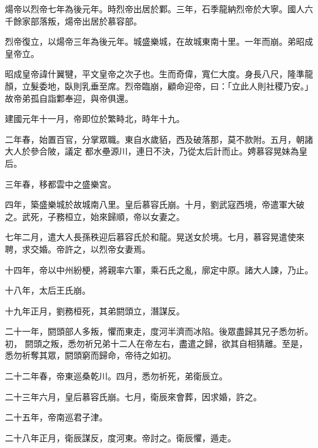 \begin{pinyinscope}
 煬帝以烈帝七年為後元年。時烈帝出居於鄴。三年，石季龍納烈帝於大寧。國人六千餘家部落叛，煬帝出居於慕容部。



 烈帝復立，以煬帝三年為後元年。城盛樂城，在故城東南十里。一年而崩。弟昭成皇帝立。



 昭成皇帝諱什翼犍，平文皇帝之次子也。生而奇偉，寬仁大度。身長八尺，隆準龍顏，立髮委地，臥則乳垂至席。烈帝臨崩，顧命迎帝，曰：「立此人則社稷乃安。」故帝弟孤自詣鄴奉迎，與帝俱還。



 建國元年十一月，帝即位於繁畤北，時年十九。



 二年春，始置百官，分掌眾職。東自水歲貊，西及破落那，莫不款附。五月，朝諸大人於參合陂，議定
 都水壘源川，連日不決，乃從太后計而止。娉慕容晃妹為皇后。



 三年春，移都雲中之盛樂宮。



 四年，築盛樂城於故城南八里。皇后慕容氏崩。十月，劉武寇西境，帝遣軍大破之。武死，子務桓立，始來歸順，帝以女妻之。



 七年二月，遣大人長孫秩迎后慕容氏於和龍。晃送女於境。七月，慕容晃遣使來聘，求交婚。帝許之，以烈帝女妻焉。



 十四年，帝以中州紛梗，將親率六軍，乘石氏之亂，廓定中原。諸大人諫，乃止。



 十八年，太后王氏崩。



 十九年正月，劉務桓死，其弟閼頭立，潛謀反。



 二十一年，閼頭部人多叛，懼而東走，度河半濟而冰陷。後眾盡歸其兄子悉勿祈。初，
 閼頭之叛，悉勿祈兄弟十二人在帝左右，盡遣之歸，欲其自相猜離。至是，悉勿祈奪其眾，閼頭窮而歸命，帝待之如初。



 二十二年春，帝東巡桑乾川。四月，悉勿祈死，弟衛辰立。



 二十三年六月，皇后慕容氏崩。七月，衛辰來會葬，因求婚，許之。



 二十五年，帝南巡君子津。



 二十八年正月，衛辰謀反，度河東。帝討之。衛辰懼，遁走。




\end{pinyinscope}
